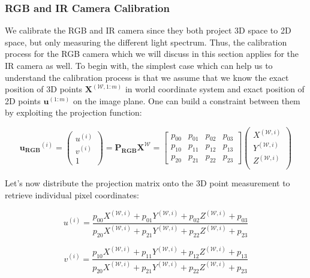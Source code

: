 \documentclass[12pt]{report}
\numberwithin{figure}{section}
\begin{document}
\subsubsection{RGB and IR Camera Calibration}

We calibrate the RGB and IR camera since they both project 3D space to 2D 
space, 
but only measuring the different light spectrum. Thus, the calibration process 
for the RGB camera which we will discuss in this section applies for the IR 
camera as well.  To 
begin with, the simplest case which can help us to understand the calibration 
process is that we assume that we know the exact position of 3D points 
$\mathbf{X}^{(\mathcal{W}, 1:m)}$ in 
world coordinate system and exact position of 2D points $\mathbf{u}^{(1:m)}$ 
on 
the image plane.  
One can build a constraint between them by exploiting the projection function:

\begin{equation}
  \mathbf{u_{RGB}}^{(i)} = 
  \begin{pmatrix}
    u^{(i)}\\
    v^{(i)}\\
    1
  \end{pmatrix}
  =
  \mathbf{P_{RGB}}\mathbf{X^{\mathcal{W}}} = 
  \begin{bmatrix}
    p_{00} & p_{01} & p_{02} & p_{03}\\
    p_{10} & p_{11} & p_{12} & p_{13}\\
    p_{20} & p_{21} & p_{22} & p_{23}
  \end{bmatrix}
  \begin{pmatrix}
    X^{(\mathcal{W}, i)}\\
    Y^{(\mathcal{W}, i)}\\
    Z^{(\mathcal{W}, i)}\\
  \end{pmatrix}\label{eq:proj_matrix}
\end{equation} 

Let's now distribute the projection matrix onto the 3D point measurement to 
retrieve individual pixel coordinates:

\begin{equation}\label{eq:u_i}
  u^{(i)} = 
  \frac
  {p_{00}X^{(\mathcal{W}, i)} + p_{01}Y^{(\mathcal{W}, i)} + 
  p_{02}Z^{(\mathcal{W}, i)} + p_{03}}
  {p_{20}X^{(\mathcal{W}, i)} + p_{21}Y^{(\mathcal{W}, i)} + 
  p_{22}Z^{(\mathcal{W}, i)} + p_{23}}
\end{equation} 

\begin{equation}\label{eq:v_i}
  v^{(i)} = 
  \frac
  {p_{10}X^{(\mathcal{W}, i)} + p_{11}Y^{(\mathcal{W}, i)} + 
  p_{12}Z^{(\mathcal{W}, i)} + p_{13}}
  {p_{20}X^{(\mathcal{W}, i)} + p_{21}Y^{(\mathcal{W}, i)} + 
  p_{22}Z^{(\mathcal{W}, i)} + p_{23}}
\end{equation} 
\end{document}
